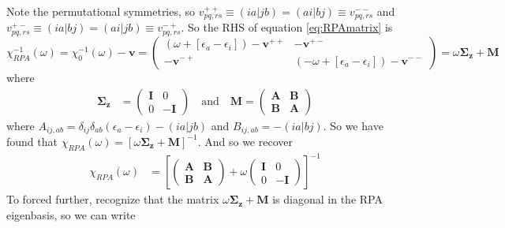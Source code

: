 \documentclass[12pt]{article}
\begin{document}
Note the permutational symmetries, so $v^{++}_{pq,rs} \equiv (ia|jb) = (ai|bj) \equiv v^{--}_{pq,rs}$ and $v^{+-}_{pq,rs} \equiv (ia|bj) = (ai|jb) \equiv v^{-+}_{pq,rs}$. So the RHS of equation \ref{eq:RPAmatrix} is
\begin{equation}
    \chi_{RPA}^{-1}(\omega) = \chi_0^{-1}(\omega) - \mathbf{v} = \begin{pmatrix}
        \left(\omega + \left[\epsilon_a - \epsilon_i\right]\right) - \mathbf{v}^{++} & -\mathbf{v}^{+-} \\
        -\mathbf{v}^{-+} & \left(-\omega + \left[\epsilon_a - \epsilon_i\right]\right) - \mathbf{v}^{--}
    \end{pmatrix}
= \omega \mathbf{\Sigma_z} + \mathbf{M}
\end{equation}
where 
\begin{align}
\mathbf{\Sigma_z} &= \begin{pmatrix}
    \mathbf{I} & 0 \\
    0 & -\mathbf{I}
\end{pmatrix}  \quad \text{and} \quad \mathbf{M} = \begin{pmatrix}
    \textbf{A} & \textbf{B} \\
    \textbf{B} & \textbf{A}
\end{pmatrix}
\end{align}
where $A_{ij,ab} = \delta_{ij}\delta_{ab}\left(\epsilon_a - \epsilon_i\right) - (ia|jb)$ and $B_{ij,ab} = -(ia|bj)$. So we have found that $\chi_{RPA}(\omega) = \left[\omega \mathbf{\Sigma_z} + \mathbf{M}\right]^{-1}$. And so we recover
\begin{align}
\chi_{RPA}(\omega) &= \left[\left(\begin{array}{ll}
\mathbf{A} & \mathbf{B} \\
\mathbf{B} & \mathbf{A}
\end{array}\right)+\omega\left(\begin{array}{cc}
\mathbf{I} & 0 \\
0 & -\mathbf{I}
\end{array}\right)\right]^{-1}
\end{align}
To forced further, recognize that the matrix $\omega \mathbf{\Sigma_z} + \mathbf{M}$ is diagonal in the RPA eigenbasis, so we can write
\end{document}
